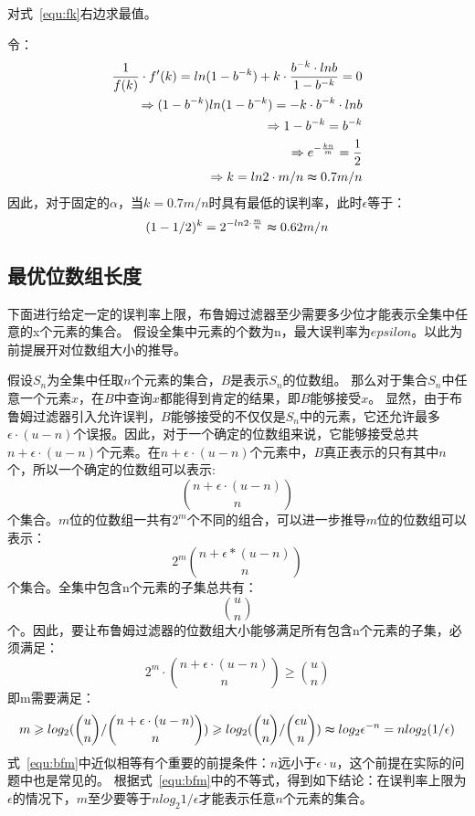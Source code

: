 对式~\ref{equ:fk}右边求最值。

令：
\begin{equation}
\begin{split}
\frac{1}{f(k)}\cdot f'(k) = ln(1 - b^{-k}) + k\cdot \frac{b^{-k}\cdot lnb}{1 - b^{-k}} = 0 \\
\Rightarrow (1 - b^{-k}) ln(1 - b^{-k}) = -k\cdot b^{-k}\cdot lnb \\
\Rightarrow 1 - b^{-k} = b^{-k} \\
\Rightarrow e^{-\frac{kn}{m}} = \frac{1}{2}\\
\Rightarrow k = ln2\cdot {m/n} \thickapprox 0.7{m/n}
\end{split}
\end{equation}
因此，对于固定的$\alpha$，当$k = 0.7{m/n}$时具有最低的误判率，此时$\epsilon$等于：
\begin{equation}
(1 - {1/2})^k = 2^{-ln2\cdot\frac{m}{n}} \thickapprox 0.62{m/n}
\end{equation}

\subsection{最优位数组长度}
\label{sec:opt_m}
下面进行给定一定的误判率上限，布鲁姆过滤器至少需要多少位才能表示全集中任意的x个元素的集合。
假设全集中元素的个数为n，最大误判率为$epsilon$。以此为前提展开对位数组大小的推导。

假设$S_n$为全集中任取$n$个元素的集合，$B$是表示$S_n$的位数组。
那么对于集合$S_n$中任意一个元素$x$，在$B$中查询$x$都能得到肯定的结果，即$B$能够接受$x$。
显然，由于布鲁姆过滤器引入允许误判，$B$能够接受的不仅仅是$S_n$中的元素，它还允许最多$\epsilon \cdot(u - n)$个误报。因此，对于一个确定的位数组来说，它能够接受总共$n +\epsilon\cdot(u - n)$个元素。在$n + \epsilon\cdot(u - n)$个元素中，$B$真正表示的只有其中$n$个，所以一个确定的位数组可以表示:
\begin{equation}
\binom{n + \epsilon \cdot(u - n)}{n}
\end{equation}
个集合。$m$位的位数组一共有$2^m$个不同的组合，可以进一步推导$m$位的位数组可以表示：
\begin{equation}
2^m\binom{n + \epsilon *\left(u - n\right)}{n}
\end{equation}
个集合。全集中包含n个元素的子集总共有：
\begin{equation}
\binom{u}{n}
\end{equation}
个。因此，要让布鲁姆过滤器的位数组大小能够满足所有包含n个元素的子集，必须满足：
\begin{equation}
2^m\cdot\binom{n + \epsilon \cdot(u - n)}{n} \geq \binom{u}{n}
\end{equation}
即m需要满足：
\begin{equation}
m \geq log_2({\binom{u}{n}/\binom{n + \epsilon \cdot(u - n)}{n}}) \geq log_2({\binom{u}{n}/\binom{\epsilon u}{n}}) \thickapprox log_2\epsilon^{-n} = n log_2({1/\epsilon})
\label{equ:bfm}
\end{equation}
式~\ref{equ:bfm}中近似相等有个重要的前提条件：$n$远小于$\epsilon\cdot u$，这个前提在实际的问题中也是常见的。
根据式~\ref{equ:bfm}中的不等式，得到如下结论：在误判率上限为$\epsilon$的情况下，$m$至少要等于$nlog_2{1/\epsilon}$才能表示任意$n$个元素的集合。

